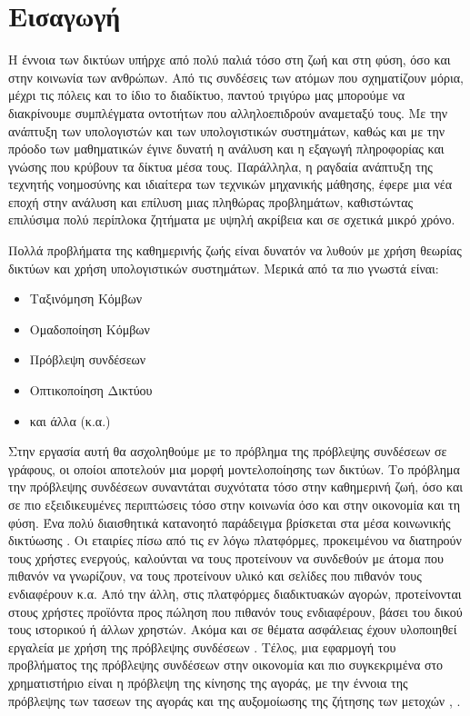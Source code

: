 \chapter{Εισαγωγή}

Η έννοια των δικτύων υπήρχε από πολύ παλιά τόσο στη ζωή και στη φύση, όσο και στην κοινωνία των ανθρώπων.
Από τις συνδέσεις των ατόμων που σχηματίζουν μόρια, μέχρι τις πόλεις και το ίδιο το διαδίκτυο, παντού
τριγύρω μας μπορούμε να διακρίνουμε συμπλέγματα οντοτήτων που αλληλοεπιδρούν αναμεταξύ τους. Με την 
ανάπτυξη των υπολογιστών και των υπολογιστικών συστημάτων, καθώς και με την πρόοδο των μαθηματικών
έγινε δυνατή η ανάλυση και η εξαγωγή πληροφορίας και γνώσης που κρύβουν τα δίκτυα μέσα τους. Παράλληλα,
η ραγδαία ανάπτυξη της τεχνητής νοημοσύνης και ιδιαίτερα των τεχνικών μηχανικής μάθησης, έφερε μια νέα
εποχή στην ανάλυση και επίλυση μιας πληθώρας προβλημάτων, καθιστώντας επιλύσιμα πολύ περίπλοκα ζητήματα
με υψηλή ακρίβεια και σε σχετικά μικρό χρόνο.

Πολλά προβλήματα της καθημερινής ζωής είναι δυνατόν να λυθούν με χρήση θεωρίας δικτύων και χρήση 
υπολογιστικών συστημάτων. Μερικά από τα πιο γνωστά είναι:

\begin{itemize}
    \item Ταξινόμηση Κόμβων
    \item Ομαδοποίηση Κόμβων
    \item Πρόβλεψη συνδέσεων
    \item Οπτικοποίηση Δικτύου
    \item και άλλα (κ.α.)
\end{itemize}

Στην εργασία αυτή θα ασχοληθούμε με το πρόβλημα της πρόβλεψης συνδέσεων σε  γράφους, οι οποίοι αποτελούν μια μορφή μοντελοποίησης
 των δικτύων. Το πρόβλημα  την πρόβλεψης συνδέσεων συναντάται συχνότατα τόσο στην καθημερινή ζωή,
όσο και σε πιο εξειδικευμένες περιπτώσεις τόσο στην κοινωνία όσο και στην οικονομία και τη φύση.
Ένα πολύ διαισθητικά κατανοητό παράδειγμα βρίσκεται στα μέσα κοινωνικής δικτύωσης \cite{al2011survey}. 
Οι εταιρίες πίσω 
από τις εν λόγω πλατφόρμες, προκειμένου να διατηρούν τους χρήστες ενεργούς, καλούνται να τους
προτείνουν να συνδεθούν με άτομα που πιθανόν να γνωρίζουν, να τους προτείνουν υλικό και σελίδες που
πιθανόν τους ενδιαφέρουν κ.α. Από την άλλη, στις πλατφόρμες διαδικτυακών αγορών, προτείνονται στους
χρήστες προϊόντα προς πώληση που πιθανόν τους ενδιαφέρουν, βάσει του δικού τους ιστορικού  ή  άλλων
χρηστών.
Ακόμα και σε θέματα ασφάλειας έχουν υλοποιηθεί εργαλεία με χρήση της πρόβλεψης συνδέσεων 
\cite{berlusconi2016link}. Τέλος, μια εφαρμογή του προβλήματος της πρόβλεψης συνδέσεων στην οικονομία
και πιο συγκεκριμένα στο χρηματιστήριο είναι η πρόβλεψη της κίνησης της αγοράς, με την έννοια της
πρόβλεψης των τασεων της αγοράς και της αυξομοίωσης της ζήτησης των μετοχών 
\cite{stockpred}, \cite{Souza_2019}.

